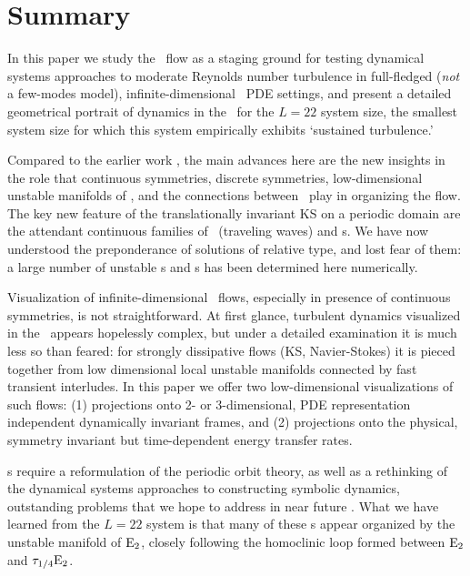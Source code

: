 
\section{Summary}
\label{sect:rpo-sum}

In this paper we study the \KS\ flow as a staging ground for
testing dynamical systems approaches to
moderate Reynolds number turbulence in full-fledged
({\em not} a few-modes model),
infinite-dimensional \statesp\ PDE settings,
and present a detailed geometrical portrait of dynamics in the
{\KS} \statesp\ for the $L=22$ system size, the smallest
system size for which this system empirically exhibits
`sustained turbulence.'

Compared to the earlier work
,
the main advances here are the new insights in
the role that continuous symmetries,
discrete symmetries,
low-dimensional unstable manifolds of \eqva,
and the connections between \eqva\ play in organizing the flow.
The key new feature of the translationally invariant KS
on a periodic domain
are the attendant continuous families of
\reqva\ (traveling waves) and \rpo s.
We have now understood the preponderance of solutions of
relative type, and lost fear of them:
a large number of unstable \rpo s and \po s has been determined
here numerically.

Visualization of infinite-dimensional
\statesp\ flows, especially in presence of continuous symmetries,
is not straightforward.
At first glance, turbulent dynamics visualized in the \statesp\ appears
hopelessly complex, but under a detailed examination it is
much less so than feared: for strongly dissipative flows (KS, Navier-Stokes)
it is pieced together from low dimensional
local unstable manifolds connected by fast transient interludes.
In this paper we offer two low-dimensional visualizations of such
flows: (1) projections onto 2- or 3-dimensional,
PDE representation independent
dynamically invariant frames, and
(2) projections onto
the physical, symmetry invariant but time-dependent
energy transfer rates.

\Rpo s require a reformulation of the periodic orbit
theory, as well as a rethinking of the dynamical
systems approaches to constructing symbolic dynamics,
outstanding problems that we hope to address in near future%
.
What we have learned from the $L=22$ system  is that many of
these \rpo s appear organized by the unstable manifold of
$\mathrm{E}_{2}$, closely following the homoclinic loop formed
between $\mathrm{E}_{2}$ and $\tau_{1/4}\mathrm{E}_{2}$.

